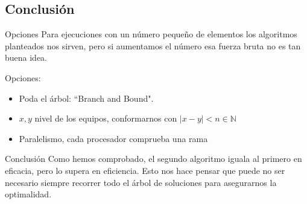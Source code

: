\subsection{Conclusión}
\begin{frame}
	\begin{block}{Opciones}
	Para ejecuciones con un número pequeño de elementos los algoritmos planteados nos sirven, 
	pero si aumentamos el número esa fuerza bruta no es tan buena idea.
	
	Opciones:
	\begin{itemize}
		\item Poda el árbol: ``Branch and Bound".
		\item $x,y$ nivel de los equipos, conformarnos con $|x-y|<n\in\mathbb{N}$
		\item Paralelismo, cada procesador comprueba una rama
	\end{itemize}
	\end{block}
	
	\pause
	\begin{alertblock}{Conclusión}
	Como hemos comprobado, el segundo algoritmo iguala al primero en eficacia, pero lo supera
	en eficiencia.
	Esto nos hace pensar que puede no ser necesario siempre recorrer todo el árbol de soluciones 
	para asegurarnos la optimalidad.
	\end{alertblock}
\end{frame}